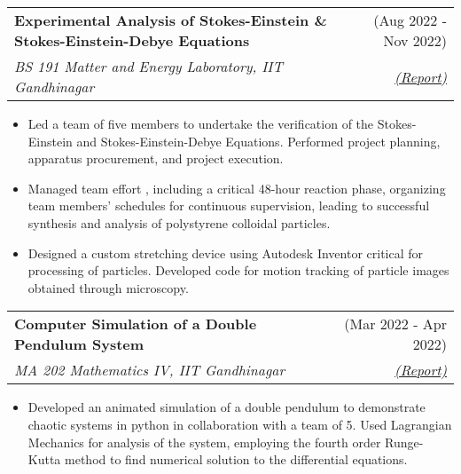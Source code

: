 \documentclass[a4paper,10pt]{report}
\makeatletter
\newcommand{\resumeSubheading}[4]{
  \vspace{-1pt}\item
    \begin{tabular*}{0.97\textwidth}[t]{l@{\extracolsep{\fill}}r}
      \textbf{#1} & #2 \\
      \textit{\small#3} & \textit{\small #4} \\
    \end{tabular*}\vspace{-6pt}
}
\makeatother
\begin{document}
\vspace{-6pt}

    \resumeSubheading
      {Experimental Analysis of Stokes-Einstein \& Stokes-Einstein-Debye Equations}{(Aug 2022 - Nov 2022)}{BS 191 Matter and Energy Laboratory, IIT Gandhinagar}
      {\textcolor{lightblue}{\href{https://drive.google.com/file/d/1bTYEfIJr_yOuy1eHvitEQpjc5D6bzoEW/view?usp=sharing}{(Report)}}}{}
       \begin{itemize}
        \item Led a team of five members to undertake the verification of the Stokes-Einstein and Stokes-Einstein-Debye Equations. Performed project planning, apparatus procurement, and project execution.
        \vspace{-2pt}
        \item Managed team effort , including a critical 48-hour reaction phase, organizing team members' schedules for continuous supervision, leading to successful synthesis and analysis of polystyrene colloidal particles.
        \vspace{-2pt}
        \item Designed a custom stretching device using Autodesk Inventor critical for processing of particles. Developed code for motion tracking of particle images obtained through microscopy.
     \end{itemize}

\vspace{-6pt}

    \resumeSubheading
      {Computer Simulation of a Double Pendulum System}{(Mar 2022 - Apr 2022)}{MA 202 Mathematics IV, IIT Gandhinagar}
      {\textcolor{lightblue}{\href{https://drive.google.com/file/d/1-EFRKVZxgTvrAgzBkCjlADpQfkhaO6c0/view?usp=sharing}{(Report)}}}{}
       \begin{itemize}
        \item Developed an animated simulation of a double pendulum to demonstrate chaotic systems in python in collaboration with a team of 5. Used Lagrangian Mechanics for analysis of the system, employing the fourth order Runge-Kutta method to find numerical solution to the differential equations.
     \end{itemize}


\vspace{-6pt}
\end{document}
